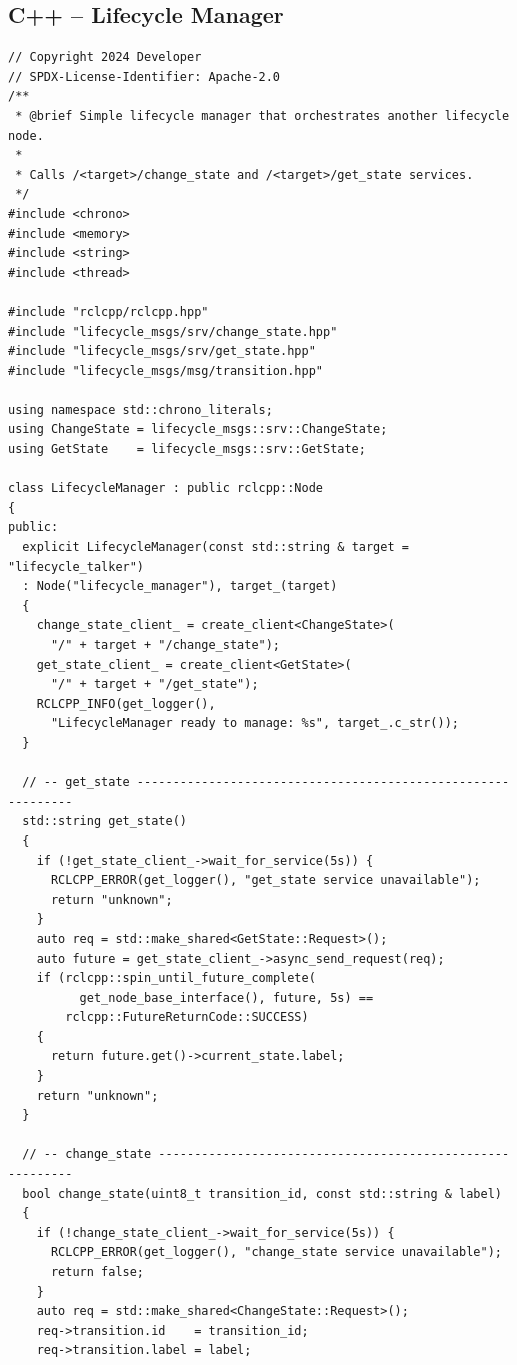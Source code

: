 \documentclass[11pt,a4paper]{csarticle}
\begin{document}
\subsection{C++ -- Lifecycle Manager}

\begin{lstlisting}[style=cpp,caption={src/lifecycle\_manager.cpp}]
// Copyright 2024 Developer
// SPDX-License-Identifier: Apache-2.0
/**
 * @brief Simple lifecycle manager that orchestrates another lifecycle node.
 *
 * Calls /<target>/change_state and /<target>/get_state services.
 */
#include <chrono>
#include <memory>
#include <string>
#include <thread>

#include "rclcpp/rclcpp.hpp"
#include "lifecycle_msgs/srv/change_state.hpp"
#include "lifecycle_msgs/srv/get_state.hpp"
#include "lifecycle_msgs/msg/transition.hpp"

using namespace std::chrono_literals;
using ChangeState = lifecycle_msgs::srv::ChangeState;
using GetState    = lifecycle_msgs::srv::GetState;

class LifecycleManager : public rclcpp::Node
{
public:
  explicit LifecycleManager(const std::string & target = "lifecycle_talker")
  : Node("lifecycle_manager"), target_(target)
  {
    change_state_client_ = create_client<ChangeState>(
      "/" + target + "/change_state");
    get_state_client_ = create_client<GetState>(
      "/" + target + "/get_state");
    RCLCPP_INFO(get_logger(),
      "LifecycleManager ready to manage: %s", target_.c_str());
  }

  // -- get_state -------------------------------------------------------------
  std::string get_state()
  {
    if (!get_state_client_->wait_for_service(5s)) {
      RCLCPP_ERROR(get_logger(), "get_state service unavailable");
      return "unknown";
    }
    auto req = std::make_shared<GetState::Request>();
    auto future = get_state_client_->async_send_request(req);
    if (rclcpp::spin_until_future_complete(
          get_node_base_interface(), future, 5s) ==
        rclcpp::FutureReturnCode::SUCCESS)
    {
      return future.get()->current_state.label;
    }
    return "unknown";
  }

  // -- change_state ----------------------------------------------------------
  bool change_state(uint8_t transition_id, const std::string & label)
  {
    if (!change_state_client_->wait_for_service(5s)) {
      RCLCPP_ERROR(get_logger(), "change_state service unavailable");
      return false;
    }
    auto req = std::make_shared<ChangeState::Request>();
    req->transition.id    = transition_id;
    req->transition.label = label;


\end{lstlisting}
\end{document}
